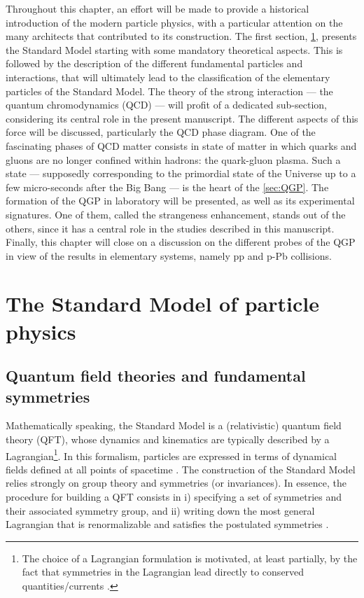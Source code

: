 Throughout this chapter, an effort will be made to provide a historical introduction of the modern particle physics, with a particular attention on the many architects that contributed to its construction. The first section, \Sec\ref{sec:StdModel}, presents the Standard Model starting with some mandatory theoretical aspects. This is followed by the description of the different fundamental particles and interactions, that will ultimately lead to the classification of the elementary particles of the Standard Model. The theory of the strong interaction --- the quantum chromodynamics (QCD) --- will profit of a dedicated sub-section, considering its central role in the present manuscript. The different aspects of this force will be discussed, particularly the QCD phase diagram. One of the fascinating phases of QCD matter consists in state of matter in which quarks and gluons are no longer confined within hadrons: the quark-gluon plasma. Such a state --- supposedly corresponding to the primordial state of the Universe up to a few micro-seconds after the Big Bang ---  is the heart of the \Sec\ref{sec:QGP}. The formation of the QGP in laboratory will be presented, as well as its experimental signatures. One of them, called the strangeness enhancement, stands out of the others, since it has a central role in the studies described in this manuscript. Finally, this chapter will close on a discussion on the different probes of the QGP in view of the  results in elementary systems, namely pp and p-Pb collisions.


\section{The Standard Model of particle physics}
\label{sec:StdModel}

\subsection{Quantum field theories and fundamental symmetries}
\label{subsec:Theory}

Mathematically speaking, the Standard Model is a (relativistic) quantum field theory (QFT), whose dynamics and kinematics are typically described by a Lagrangian\footnote{The choice of a Lagrangian formulation is motivated, at least partially, by the fact that symmetries in the Lagrangian lead directly to conserved quantities/currents \cite{kochAspectsChiralSymmetry1997}.}. In this formalism, particles are expressed in terms of dynamical fields defined at all points of spacetime \cite{peskinIntroductionQuantumField2018}. The construction of the Standard Model relies strongly on group theory and symmetries (or invariances). In essence, the procedure for building a QFT consists in i) specifying a set of symmetries and their associated symmetry group, and ii) writing down the most general Lagrangian that is renormalizable and satisfies the postulated symmetries \cite{braibantParticlesFundamentalInteractions2012}.

